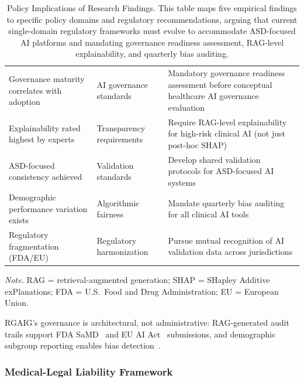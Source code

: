 \begin{table}[H]
\tablestripes\tablefontsize
\tablefontsize
\caption[Policy Implications of Research Findings]{Policy Implications of Research Findings. This table maps five empirical findings to specific policy domains and regulatory recommendations, arguing that current single-domain regulatory frameworks must evolve to accommodate ASD-focused AI platforms and mandating governance readiness assessment, RAG-level explainability, and quarterly bias auditing.}
\begin{tabularx}{\textwidth}{@{} L p{2.8cm} L @{}}
\toprule
{} &  &  \\
\midrule
Governance maturity correlates with adoption & AI governance standards & Mandatory governance readiness assessment before conceptual healthcare AI governance evaluation \\
\addlinespace
Explainability rated highest by experts & Transparency requirements & Require RAG-level explainability for high-risk clinical AI (not just post-hoc SHAP) \\
\addlinespace
ASD-focused consistency achieved & Validation standards & Develop shared validation protocols for ASD-focused AI systems \\
\addlinespace
Demographic performance variation exists & Algorithmic fairness & Mandate quarterly bias auditing for all clinical AI tools \\
\addlinespace
Regulatory fragmentation (FDA/EU) & Regulatory harmonization & Pursue mutual recognition of AI validation data across jurisdictions \\
\bottomrule
\end{tabularx}
\vspace{0.5em}\noindent\textit{Note.} RAG = retrieval-augmented generation; SHAP = SHapley Additive exPlanations; FDA = U.S.\ Food and Drug Administration; EU = European Union.
\end{table}

\noindent RGAIG's governance is architectural, not administrative: RAG-generated audit trails support FDA SaMD~\cite{fda2021aiml} and EU AI Act~\cite{eu2021aiact} submissions, and demographic subgroup reporting enables bias detection~\cite{jobin2019ethics, char2018ethics}.

\subsubsection{Medical-Legal Liability Framework}

